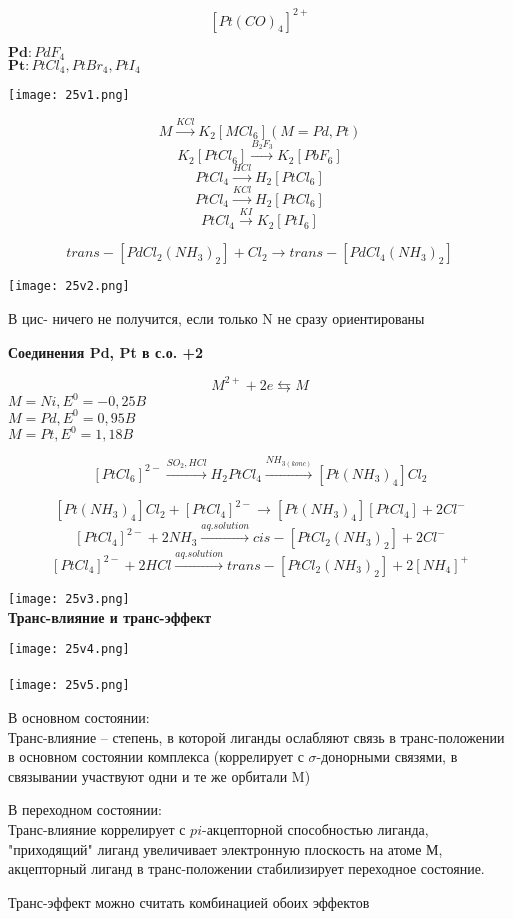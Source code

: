 $$[Pt(CO)_4]^{2+}$$


$\textbf{Pd} : PdF_4$\\
$\textbf{Pt} : PtCl_4, PtBr_4, PtI_4$

\texttt{[image: 25v1.png]}

$$M \xrightarrow{KCl} K_2[MCl_6] (M = Pd, Pt)$$
$$K_2[PtCl_6] \xrightarrow{B_2F_3} K_2[PbF_6]$$
$$PtCl_4 \xrightarrow{HCl} H_2[PtCl_6]$$
$$PtCl_4 \xrightarrow{KCl} H_2[PtCl_6]$$
$$PtCl_4 \xrightarrow{KI} K_2[PtI_6]$$

$$trans-[PdCl_2(NH_3)_2] + Cl_2 \rightarrow trans-[PdCl_4(NH_3)_2]$$

\texttt{[image: 25v2.png]}

В цис- ничего не получится, если только N не сразу ориентированы

\textbf{Соединения Pd, Pt в с.о. +2}

$$M^{2+} + 2e \leftrightarrows M$$
$M = Ni, E^0 = -0,25 B$\\
$M = Pd, E^0 = 0,95 B$\\
$M = Pt, E^0 = 1,18 B$

$$[PtCl_6]^{2-} \xrightarrow{SO_2, HCl} H_2PtCl_4 \xrightarrow{NH_{3(konc)}} [Pt(NH_3)_4]Cl_2$$

$$[Pt(NH_3)_4]Cl_2 + [PtCl_4]^{2-} \rightarrow [Pt(NH_3)_4][PtCl_4] + 2Cl^-$$
$$[PtCl_4]^{2-} + 2NH_3\xrightarrow{aq.solution} cis-[PtCl_2(NH_3)_2] + 2Cl^-$$
$$[PtCl_4]^{2-} + 2HCl \xrightarrow{aq. solution} trans-[PtCl_2(NH_3)_2] + 2[NH_4]^+$$

\texttt{[image: 25v3.png]}
\\

\textbf{Транс-влияние и транс-эффект}

\texttt{[image: 25v4.png]}\\
\\

\texttt{[image: 25v5.png]}

В основном состоянии:\\
Транс-влияние -- степень, в которой лиганды ослабляют связь в транс-положении в основном состоянии комплекса (коррелирует с $\sigma$-донорными связями, в связывании участвуют одни и те же орбитали M)

В переходном состоянии:\\
Транс-влияние коррелирует с $pi$-акцепторной способностью лиганда, "приходящий" лиганд увеличивает электронную плоскость на атоме М, акцепторный лиганд в транс-положении стабилизирует переходное состояние.

Транс-эффект можно считать комбинацией обоих эффектов

